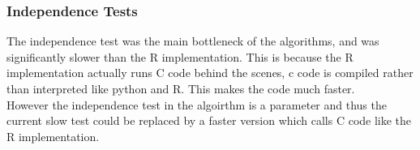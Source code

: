 \documentclass{article}
\begin{document}
\subsubsection{Independence Tests}
The independence test was the main bottleneck of the algorithms, and was significantly slower than the R implementation. This is because the R implementation actually runs C code behind the scenes, c code is compiled rather than interpreted like python and R. This makes the code much faster.\\
 
However the independence test in the algoirthm is a parameter and thus the current slow test could be replaced by a faster version which calls C code like the R implementation.\\ 
\end{document}
